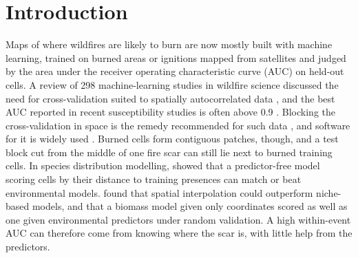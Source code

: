 \documentclass[preprint,12pt,authoryear]{elsarticle}
\begin{document}
\section{Introduction}
\label{sec:intro}

Maps of where wildfires are likely to burn are now mostly built with machine learning, trained on burned areas or ignitions mapped from satellites and judged by the area under the receiver operating characteristic curve (AUC) on held-out cells. A review of 298 machine-learning studies in wildfire science discussed the need for cross-validation suited to spatially autocorrelated data \citep{Jain2020}, and the best AUC reported in recent susceptibility studies is often above 0.9 \citep{Iban2022,Trucchia2023,Zerouali2026}. Blocking the cross-validation in space is the remedy recommended for such data \citep{Roberts2017}, and software for it is widely used \citep{Valavi2019}. Burned cells form contiguous patches, though, and a test block cut from the middle of one fire scar can still lie next to burned training cells. In species distribution modelling, \citet{Hijmans2012} showed that a predictor-free model scoring cells by their distance to training presences can match or beat environmental models. \citet{Bahn2007} found that spatial interpolation could outperform niche-based models, and \citet{Ploton2020} that a biomass model given only coordinates scored as well as one given environmental predictors under random validation. A high within-event AUC can therefore come from knowing where the scar is, with little help from the predictors.
\end{document}
